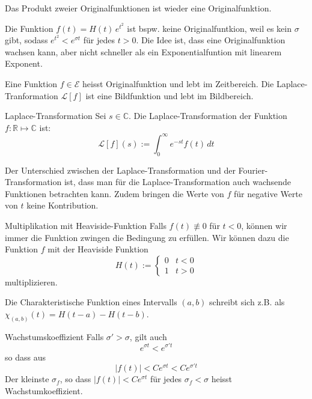 \documentclass[a4paper,10pt]{article}
\def\R{\mathbb{R}}
\def\C{\mathbb{C}}
\begin{document}
Das Produkt zweier Originalfunktionen ist wieder eine Originalfunktion.

Die Funktion \(f(t)=H(t)\,e^{t^2}\) ist bspw. keine Originalfuntkion, weil es kein \(\sigma\) gibt, sodass \(e^{t^2} < e^{\sigma t}\) für jedes \(t > 0\). Die Idee ist, dass eine Originalfunktion wachsen kann, aber nicht schneller als ein Exponentialfuntion mit linearem Exponent.

Eine Funktion $f \in \mathcal{E}$ heisst Originalfunktion und lebt im Zeitbereich. Die Laplace-Tranformation $\mathcal{L}[f]$ ist eine Bildfunktion und lebt im Bildbereich.

\begin{mainbox}{Laplace-Transformation}
  Sei $s \in \C$. Die Laplace-Transformation der Funktion $f: \R \mapsto \C$ ist:
  \begin{equation*}
    \mathcal{L}[f](s):=\int_0^\infty e^{-st}f(t)\,dt
\end{equation*}
\end{mainbox}

Der Unterschied zwischen der Laplace-Transformation und der Fourier-Transformation ist, dass man für die Laplace-Transformation auch wachsende Funktionen betrachten kann. Zudem bringen die Werte von $f$ für negative Werte von $t$ keine Kontribution.

\begin{subbox}{Multiplikation mit Heaviside-Funktion}
  Falls \(f(t)\not\equiv0\) für \(t<0\), können wir immer die Funktion zwingen die Bedingung zu erfüllen. Wir können dazu die Funktion \(f\) mit der Heaviside Funktion \begin{equation*} H(t):=\begin{cases} 0 & t < 0 \\ 1 & t > 0 \end{cases} \end{equation*} multiplizieren.
\end{subbox}

Die Charakteristische Funktion eines Intervalls $(a,b)$ schreibt sich z.B. als \(\chi_{(a,b)}(t)=H(t-a)-H(t-b)\).


\begin{subbox}{Wachstumskoeffizient}
  Falls \(\sigma'>\sigma\), gilt auch \begin{equation*} e^{\sigma t} < e^{\sigma' t} \end{equation*} so dass aus \begin{equation*} |f(t)| < C e^{\sigma t} < Ce^{\sigma' t} \end{equation*} Der kleinste \(\sigma_f \), so dass \(|f(t)| < Ce^{\sigma t}\) für jedes \(\sigma_f < \sigma\) heisst Wachstumkoeffizient.

\end{subbox}
\end{document}
